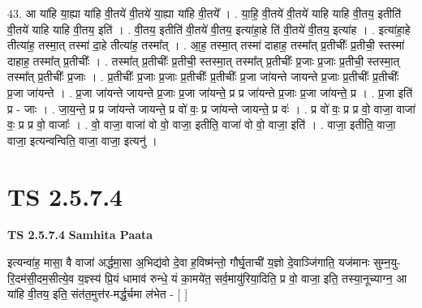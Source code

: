 \documentclass[17pt]{extarticle}
\begin{document}
43. आ या॑हि या॒ह्या या॑हि वी॒तये॑ वी॒तये॑ या॒ह्या या॑हि वी॒तये᳚ । . या॒हि॒ वी॒तये॑ वी॒तये॑ याहि याहि वी॒तय॒ इतीति॑ वी॒तये॑ याहि याहि वी॒तय॒ इति॑ । . वी॒तय॒ इतीति॑ वी॒तये॑ वी॒तय॒ इत्या॑हा॒हे ति॑ वी॒तये॑ वी॒तय॒ इत्या॑ह । . इत्या॑हा॒हे तीत्या॑ह॒ तस्मा॒त् तस्मा॑ दा॒हे तीत्या॑ह॒ तस्मा᳚त् । . आ॒ह॒ तस्मा॒त् तस्मा॑ दाहाह॒ तस्मा᳚त् प्र॒तीचीः᳚ प्र॒तीची॒ स्तस्मा॑ दाहाह॒ तस्मा᳚त् प्र॒तीचीः᳚ । . तस्मा᳚त् प्र॒तीचीः᳚ प्र॒तीची॒ स्तस्मा॒त् तस्मा᳚त् प्र॒तीचीः᳚ प्र॒जाः प्र॒जाः प्र॒तीची॒ स्तस्मा॒त् तस्मा᳚त् प्र॒तीचीः᳚ प्र॒जाः । . प्र॒तीचीः᳚ प्र॒जाः प्र॒जाः प्र॒तीचीः᳚ प्र॒तीचीः᳚ प्र॒जा जा॑यन्ते जायन्ते प्र॒जाः प्र॒तीचीः᳚ प्र॒तीचीः᳚ प्र॒जा जा॑यन्ते । . प्र॒जा जा॑यन्ते जायन्ते प्र॒जाः प्र॒जा जा॑यन्ते॒ प्र प्र जा॑यन्ते प्र॒जाः प्र॒जा जा॑यन्ते॒ प्र । . प्र॒जा इति॑ प्र - जाः । . जा॒य॒न्ते॒ प्र प्र जा॑यन्ते जायन्ते॒ प्र वो॑ वः॒ प्र जा॑यन्ते जायन्ते॒ प्र वः॑ । . प्र वो॑ वः॒ प्र प्र वो॒ वाजा॒ वाजा॑ वः॒ प्र प्र वो॒ वाजाः᳚ । . वो॒ वाजा॒ वाजा॑ वो वो॒ वाजा॒ इतीति॒ वाजा॑ वो वो॒ वाजा॒ इति॑ । . वाजा॒ इतीति॒ वाजा॒ वाजा॒ इत्यन्वन्विति॒ वाजा॒ वाजा॒ इत्यनु॑ । \newline
\pagebreak
{}
\section*{ TS 2.5.7.4 }

\textbf{TS 2.5.7.4 } \newline
\textbf{Samhita Paata} \newline

इत्यन्वा॑ह॒ मासा॒ वै वाजा॑ अर्द्धमा॒सा अ॒भिद्य॑वो दे॒वा ह॒विष्म॑न्तो॒ गौर्घृ॒ताची॑ य॒ज्ञो दे॒वाञ्जि॑गाति॒ यज॑मानः सुम्न॒यु-रि॒दम॑सी॒दम॒सीत्ये॒व य॒ज्ञ्स्य॑ प्रि॒यं धामाव॑ रुन्धे॒ यं का॒मये॑त॒ सर्व॒मायु॑रिया॒दिति॒ प्र वो॒ वाजा॒ इति॒ तस्या॒नूच्याग्न॒ आ या॑हि वी॒तय॒ इति॒ संत॑त॒मुत्त॑र-मर्द्ध॒र्चमा ल॑भेत - [  ] \newline
\end{document}
